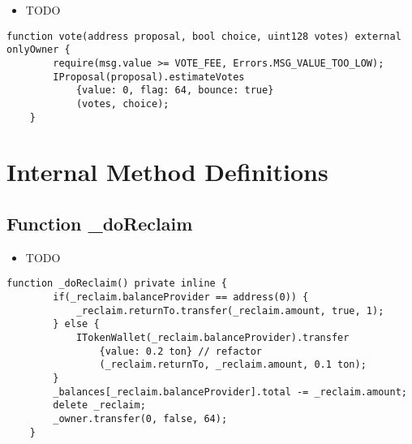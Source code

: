 \begin{itemize}
\item TODO
\end{itemize}

\begin{lstlisting}[firstnumber=53]
    function vote(address proposal, bool choice, uint128 votes) external onlyOwner {
        require(msg.value >= VOTE_FEE, Errors.MSG_VALUE_TOO_LOW);
        IProposal(proposal).estimateVotes
            {value: 0, flag: 64, bounce: true}
            (votes, choice);
    }
\end{lstlisting}

\section{Internal Method Definitions}


\subsection{Function \_{}doReclaim}

\begin{itemize}
\item TODO
\end{itemize}

\begin{lstlisting}[firstnumber=191]
    function _doReclaim() private inline {
        if(_reclaim.balanceProvider == address(0)) {
            _reclaim.returnTo.transfer(_reclaim.amount, true, 1);
        } else {
            ITokenWallet(_reclaim.balanceProvider).transfer
                {value: 0.2 ton} // refactor
                (_reclaim.returnTo, _reclaim.amount, 0.1 ton);
        }
        _balances[_reclaim.balanceProvider].total -= _reclaim.amount;
        delete _reclaim;
        _owner.transfer(0, false, 64);
    }
\end{lstlisting}
